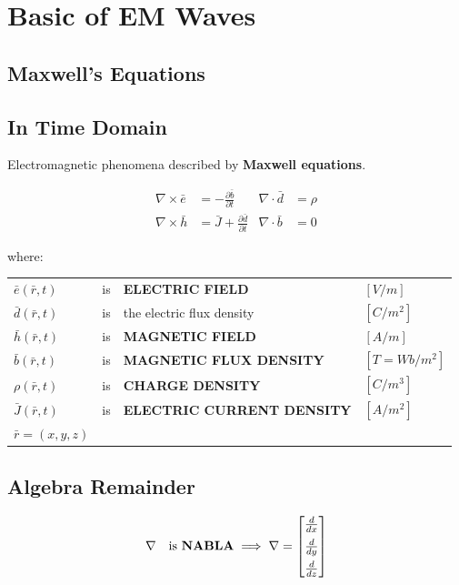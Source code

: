 
\chapter{Basic of EM Waves}

\section{Maxwell's Equations}

\section{In Time Domain}

Electromagnetic phenomena described by \textbf{Maxwell equations}.

\begin{align*}
\nabla \times \bar{e} &= - \frac{\partial \bar{b}}{\partial t} & \nabla \cdot \bar{d} &= \rho \\[1em]
\nabla \times \bar{h} &= \bar{J} + \frac{\partial \bar{d}}{\partial t} & \nabla \cdot \bar{b} &= 0
\end{align*}

where:

\begin{center}
\renewcommand{\arraystretch}{1.5}
\begin{tabular}{l l l l}
$\bar{e}(\bar{r}, t)$ & is & \textbf{ELECTRIC FIELD} & $[V/m]$ \\
$\bar{d}(\bar{r}, t)$ & is & the electric flux density & $[C/m^2]$ \\
$\bar{h}(\bar{r}, t)$ & is & \textbf{MAGNETIC FIELD} & $[A/m]$ \\
$\bar{b}(\bar{r}, t)$ & is & \textbf{MAGNETIC FLUX DENSITY} & $[T = Wb/m^2]$ \\
$\rho(\bar{r}, t)$ & is & \textbf{CHARGE DENSITY} & $[C/m^3]$ \\
$\bar{J}(\bar{r}, t)$ & is & \textbf{ELECTRIC CURRENT DENSITY} & $[A/m^2]$ \\
$\bar{r} = (x, y, z)$ & & & \\
\end{tabular}
\end{center}

\section{Algebra Remainder}

\begin{equation*}
\nabla \quad \text{is \textbf{NABLA}} \implies \nabla = 
\begin{bmatrix}
\frac{d}{dx} \\[0.5em]
\frac{d}{dy} \\[0.5em]
\frac{d}{dz}
\end{bmatrix}
\end{equation*}


